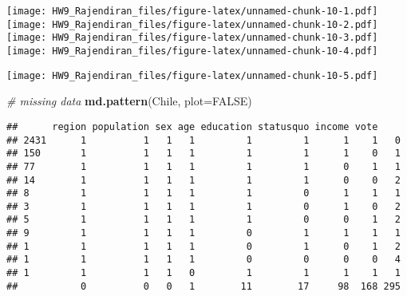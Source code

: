 \documentclass[]{article}
\newenvironment{Shaded}{\begin{snugshade}}{\end{snugshade}}
\newcommand{\CommentTok}[1]{\textcolor[rgb]{0.56,0.35,0.01}{\textit{#1}}}
\newcommand{\DataTypeTok}[1]{\textcolor[rgb]{0.13,0.29,0.53}{#1}}
\newcommand{\KeywordTok}[1]{\textcolor[rgb]{0.13,0.29,0.53}{\textbf{#1}}}
\newcommand{\NormalTok}[1]{#1}
\newcommand{\OperatorTok}[1]{\textcolor[rgb]{0.81,0.36,0.00}{\textbf{#1}}}
\newcommand{\OtherTok}[1]{\textcolor[rgb]{0.56,0.35,0.01}{#1}}
\newcommand{\StringTok}[1]{\textcolor[rgb]{0.31,0.60,0.02}{#1}}
\begin{document}
\texttt{[image: HW9\_Rajendiran\_files/figure-latex/unnamed-chunk-10-1.pdf]}
\texttt{[image: HW9\_Rajendiran\_files/figure-latex/unnamed-chunk-10-2.pdf]}
\texttt{[image: HW9\_Rajendiran\_files/figure-latex/unnamed-chunk-10-3.pdf]}
\texttt{[image: HW9\_Rajendiran\_files/figure-latex/unnamed-chunk-10-4.pdf]}

\begin{Shaded}
\end{Shaded}

\texttt{[image: HW9\_Rajendiran\_files/figure-latex/unnamed-chunk-10-5.pdf]}

\begin{Shaded}
\begin{Highlighting}[]
\CommentTok{# missing data }
\KeywordTok{md.pattern}\NormalTok{(Chile, }\DataTypeTok{plot=}\OtherTok{FALSE}\NormalTok{)}
\end{Highlighting}
\end{Shaded}

\begin{verbatim}
##      region population sex age education statusquo income vote    
## 2431      1          1   1   1         1         1      1    1   0
## 150       1          1   1   1         1         1      1    0   1
## 77        1          1   1   1         1         1      0    1   1
## 14        1          1   1   1         1         1      0    0   2
## 8         1          1   1   1         1         0      1    1   1
## 3         1          1   1   1         1         0      1    0   2
## 5         1          1   1   1         1         0      0    1   2
## 9         1          1   1   1         0         1      1    1   1
## 1         1          1   1   1         0         1      0    1   2
## 1         1          1   1   1         0         0      0    0   4
## 1         1          1   1   0         1         1      1    1   1
##           0          0   0   1        11        17     98  168 295
\end{verbatim}
\end{document}
